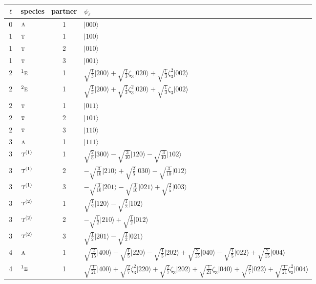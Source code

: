 \documentclass[11pt]{article}
\newcommand{\irr}[1]{\text{\normalfont\scshape #1}}
\newcommand{\conjpair}[1]{{}^{#1}}
\newcommand{\rootunity}[1]{\zeta_{#1}}
\newcommand{\occ}[1]{\lvert #1\rangle}
\begin{document}
\begin{longtable}{c l c p{}}\hline $\ell$ & species & partner & $\psi_\ell$\\ \hline\endhead
0 & $\irr{a}$ & 1 & $\occ{000}$\\
\hline
1 & $\irr{t}$ & 1 & $\occ{100}$\\
1 & $\irr{t}$ & 2 & $\occ{010}$\\
1 & $\irr{t}$ & 3 & $\occ{001}$\\
\hline
2 & $\conjpair{1}\irr{e}$ & 1 & $\sqrt{\tfrac{1}{3}}\occ{200}+\sqrt{\tfrac{1}{3}}\rootunity{3}\occ{020}+\sqrt{\tfrac{1}{3}}\rootunity{3}^{2}\occ{002}$\\
2 & $\conjpair{2}\irr{e}$ & 1 & $\sqrt{\tfrac{1}{3}}\occ{200}+\sqrt{\tfrac{1}{3}}\rootunity{3}^{2}\occ{020}+\sqrt{\tfrac{1}{3}}\rootunity{3}\occ{002}$\\
2 & $\irr{t}$ & 1 & $\occ{011}$\\
2 & $\irr{t}$ & 2 & $\occ{101}$\\
2 & $\irr{t}$ & 3 & $\occ{110}$\\
\hline
3 & $\irr{a}$ & 1 & $\occ{111}$\\
3 & $\irr{t}^{(1)}$ & 1 & $\sqrt{\tfrac{2}{5}}\occ{300}-\sqrt{\tfrac{3}{10}}\occ{120}-\sqrt{\tfrac{3}{10}}\occ{102}$\\
3 & $\irr{t}^{(1)}$ & 2 & $-\sqrt{\tfrac{3}{10}}\occ{210}+\sqrt{\tfrac{2}{5}}\occ{030}-\sqrt{\tfrac{3}{10}}\occ{012}$\\
3 & $\irr{t}^{(1)}$ & 3 & $-\sqrt{\tfrac{3}{10}}\occ{201}-\sqrt{\tfrac{3}{10}}\occ{021}+\sqrt{\tfrac{2}{5}}\occ{003}$\\
3 & $\irr{t}^{(2)}$ & 1 & $\sqrt{\tfrac{1}{2}}\occ{120}-\sqrt{\tfrac{1}{2}}\occ{102}$\\
3 & $\irr{t}^{(2)}$ & 2 & $-\sqrt{\tfrac{1}{2}}\occ{210}+\sqrt{\tfrac{1}{2}}\occ{012}$\\
3 & $\irr{t}^{(2)}$ & 3 & $\sqrt{\tfrac{1}{2}}\occ{201}-\sqrt{\tfrac{1}{2}}\occ{021}$\\
\hline
4 & $\irr{a}$ & 1 & $\sqrt{\tfrac{2}{15}}\occ{400}-\sqrt{\tfrac{1}{5}}\occ{220}-\sqrt{\tfrac{1}{5}}\occ{202}+\sqrt{\tfrac{2}{15}}\occ{040}-\sqrt{\tfrac{1}{5}}\occ{022}+\sqrt{\tfrac{2}{15}}\occ{004}$\\
4 & $\conjpair{1}\irr{e}$ & 1 & $\sqrt{\tfrac{1}{21}}\occ{400}+\sqrt{\tfrac{2}{7}}\rootunity{3}^{2}\occ{220}+\sqrt{\tfrac{2}{7}}\rootunity{3}\occ{202}+\sqrt{\tfrac{1}{21}}\rootunity{3}\occ{040}+\sqrt{\tfrac{2}{7}}\occ{022}+\sqrt{\tfrac{1}{21}}\rootunity{3}^{2}\occ{004}$\\

\end{longtable}
\end{document}
